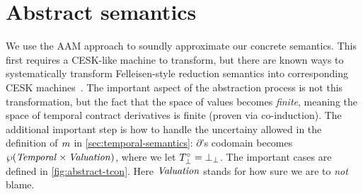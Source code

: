 

\section{Abstract semantics}\label{sec:abstract-semantics}

We use the AAM approach to soundly approximate our concrete semantics.
%
This first requires a CESK-like machine to transform, but there are known ways to systematically transform Felleisen-style reduction semantics into corresponding CESK machines~\citep{dvanhorn:Danvy-Nielsen:RS-04-26}.
%
The important aspect of the abstraction process is not this transformation, but the fact that the space of values becomes \emph{finite}, meaning the space of temporal contract derivatives is finite (proven via co-induction).
%
The additional important step is how to handle the uncertainy allowed in the definition of $\mathit{m}$ in \autoref{sec:temporal-semantics}: $\partial$'s codomain becomes $\wp(\mathit{Temporal} \times \mathit{Valuation})$, where we let $T^\circ_\bot = \bot_\bot$.
%
The important cases are defined in \autoref{fig:abstract-tcon}.
%
Here $\mathit{Valuation}$ stands for how sure we are to \emph{not} blame.
